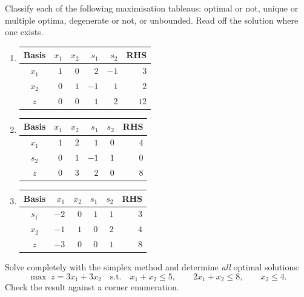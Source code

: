 \begin{problems}
  \item Classify each of the following maximisation tableaus: optimal or
        not, unique or multiple optima, degenerate or not, or unbounded.
        Read off the solution where one exists.
        \begin{enumerate}[label=(\alph*),leftmargin=1.8em,itemsep=0.5ex]
          \item \begin{tabular}[t]{c|rrrr|r}
                \hline
                Basis & $x_1$ & $x_2$ & $s_1$ & $s_2$ & RHS\\
                \hline
                $x_1$ & $1$ & $0$ & $2$ & $-1$ & $3$\\
                $x_2$ & $0$ & $1$ & $-1$ & $1$ & $2$\\
                \hline
                $z$ & $0$ & $0$ & $1$ & $2$ & $12$\\
                \hline
                \end{tabular}
          \item \begin{tabular}[t]{c|rrrr|r}
                \hline
                Basis & $x_1$ & $x_2$ & $s_1$ & $s_2$ & RHS\\
                \hline
                $x_1$ & $1$ & $2$ & $1$ & $0$ & $4$\\
                $s_2$ & $0$ & $1$ & $-1$ & $1$ & $0$\\
                \hline
                $z$ & $0$ & $3$ & $2$ & $0$ & $8$\\
                \hline
                \end{tabular}
          \item \begin{tabular}[t]{c|rrrr|r}
                \hline
                Basis & $x_1$ & $x_2$ & $s_1$ & $s_2$ & RHS\\
                \hline
                $s_1$ & $-2$ & $0$ & $1$ & $1$ & $3$\\
                $x_2$ & $-1$ & $1$ & $0$ & $2$ & $4$\\
                \hline
                $z$ & $-3$ & $0$ & $0$ & $1$ & $8$\\
                \hline
                \end{tabular}
        \end{enumerate}

  \item Solve completely with the simplex method and determine \emph{all}
        optimal solutions:
        \[
          \max\; z=3x_1+3x_2
          \quad\text{s.t.}\quad
          x_1+x_2\le 5,\qquad 2x_1+x_2\le 8,\qquad x_2\le 4 .
        \]
        Check the result against a corner enumeration.


\end{problems}
